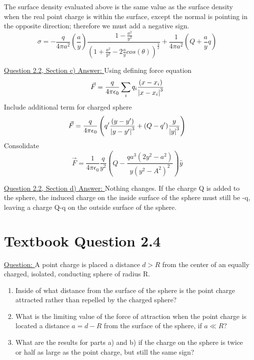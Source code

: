 \documentclass[12pt]{article}
\begin{document}
    The surface density evaluated above is the same value as the surface density when the real point charge is within the surface, except the normal is pointing in the opposite direction; therefore we must add a negative sign.
    \begin{equation} \label{eq: 10-10-3}
        \sigma = -\frac{q}{4 \pi a^2} \left(\frac{a}{y} \right) \frac{1-\frac{a^2}{y^2}}{(1+\frac{a^2}{y^2}-2\frac{a}{y}cos(\theta))^{\frac{3}{2}}} + \frac{1}{4 \pi a^2} \left(Q + \frac{a}{y}q \right)
    \end{equation}
    
    \underline{Question 2.2, Section c) Answer: }
    \newline Using defining force equation
    \begin{gather*}
        \vec{F} = \frac{q}{4 \pi \epsilon_0} \sum_i q_i \frac{(x-x_i)}{\abs{x-x_i}^3}
    \end{gather*}
    Include additional term for charged sphere
    \begin{equation} \label{eq: 10-10-5}
        \vec{F} = \frac{q}{4 \pi \epsilon_0} \left(q'\frac{(y-y')}{\abs{y-y'}^3} + (Q-q') \frac{y}{\abs{y}^3} \right)
    \end{equation}
    Consolidate
    \begin{equation} \label{eq: 10-10-5}
        \vec{F} = \frac{1}{4 \pi \epsilon_0} \frac{q}{y^2} \left(Q - \frac{q a^3 (2 y^2 - a^2)}{y (y^2 - A^2)^2} \right) \hat{y}
    \end{equation}

     
    \underline{Question 2.2, Section d) Answer: }
    Nothing changes. If the charge Q is added to the sphere, the induced charge on the inside surface of the sphere must still be -q, leaving a charge Q-q on the outside surface of the sphere.   

\newpage
\section{Textbook Question 2.4} \label{section2}
    \underline{Question: }
    \newline A point charge is placed a distance $d > R$ from the center of an equally charged, isolated, conducting sphere of radius R.
    \begin{enumerate}
        \item [a)] Inside of what distance from the surface of the sphere is the point charge attracted rather than repelled by the charged sphere?
        \item [b)] What is the limiting value of the force of attraction when the point charge is located a distance $a=d-R$ from the surface of the sphere, if $a \ll R$?
        \item [c)] What are the results for parts a) and b) if the charge on the sphere is twice or half as large as the point charge, but still the same sign?
    \end{enumerate}    
\end{document}
